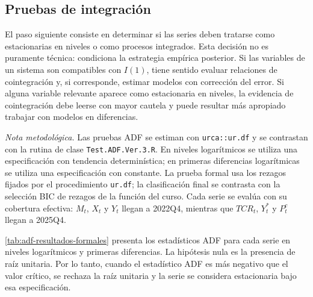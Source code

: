 \documentclass[11pt,a4paper]{article}
\begin{document}
	\subsection{Pruebas de integración}
	\label{subsec:resultados-integracion}
	
	El paso siguiente consiste en determinar si las series deben tratarse como
	estacionarias en niveles o como procesos integrados. Esta decisión no es
	puramente técnica: condiciona la estrategia empírica posterior. Si las variables
	de un sistema son compatibles con \(I(1)\), tiene sentido evaluar relaciones de
	cointegración y, si corresponde, estimar modelos con corrección del error. Si
	alguna variable relevante aparece como estacionaria en niveles, la evidencia de
	cointegración debe leerse con mayor cautela y puede resultar más apropiado
	trabajar con modelos en diferencias.
	
	\noindent\textit{Nota metodológica.} Las pruebas ADF se estiman con
	\texttt{urca::ur.df} y se contrastan con la rutina de clase
	\texttt{Test.ADF.Ver.3.R}. En niveles
	logarítmicos se utiliza una especificación con tendencia determinística; en
	primeras diferencias logarítmicas se utiliza una especificación con constante.
	La prueba formal usa los rezagos fijados por el procedimiento \texttt{ur.df}; la
	clasificación final se contrasta con la selección BIC de rezagos de la función
	del curso. Cada serie se evalúa con su cobertura efectiva: \(M_t\), \(X_t\) y
	\(Y_t\) llegan a 2022Q4, mientras que \(TCR_t\), \(Y_t^*\) y \(P_t^c\) llegan a
	2025Q4.
	
	\autoref{tab:adf-resultados-formales} presenta los estadísticos ADF para cada
	serie en niveles logarítmicos y primeras diferencias. La hipótesis nula es la
	presencia de raíz unitaria. Por lo tanto, cuando el estadístico ADF es más
	negativo que el valor crítico, se rechaza la raíz unitaria y la serie se
	considera estacionaria bajo esa especificación.
	
\end{document}
